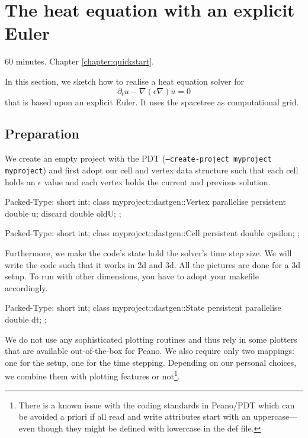\section{The heat equation with an explicit Euler}


\chapterDescription
  {
    60 minutes.
  }
  {
    Chapter \ref{chapter:quickstart}.
  }

In this section, we sketch how to realise a heat equation solver for
\[
  \partial _t u - \nabla (\epsilon \nabla) u = 0
\]
that is based
upon an explicit Euler.
It uses the spacetree as computational grid.


\subsection{Preparation}

We create an empty project with the PDT (\texttt{--create-project myproject
myproject}) and first adopt our cell and vertex data structure such that each
cell holds an $\epsilon$ value and each vertex holds the current and previous
solution.

\begin{code}
Packed-Type: short int;
class myproject::dastgen::Vertex {
  parallelise persistent double  u;
  discard                double  oldU;
};
\end{code}


\begin{code}
Packed-Type: short int;
class myproject::dastgen::Cell {
  persistent double epsilon;
};
\end{code}


\noindent
Furthermore, we make the code's state hold the solver's time step size. We will
write the code such that it works in 2d and 3d. All the pictures are done for a
3d setup. To run with other dimensions, you have to adopt your makefile
accordingly.


\begin{code}
Packed-Type: short int;
class myproject::dastgen::State { 
  persistent parallelise double dt;
};
\end{code}


\noindent
We do not use any sophisticated plotting routines and thus rely in some plotters
that are available out-of-the-box for Peano.
We also require only two mappings: one for the setup, one for the time stepping. 
Depending on our personal choices, we combine them with plotting features or
not\footnote{There is a known issue with the coding standards in Peano/PDT
which can be avoided a priori if all read and write attributes start with an
uppercase---even though they might be defined with lowercase in the def file.}.

